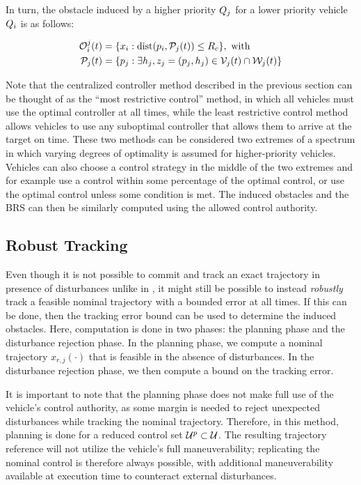 In turn, the obstacle induced by a higher priority $Q_{j}$ for a lower priority vehicle $Q_{i}$ is as follows:

\begin{equation}
\begin{aligned}
\mathcal{O}_i^j(t) &= \{x_i: \text{dist}(p_i, \mathcal{P}_j(t)) \le R_c \}, \text{ with} \\
\mathcal{P}_j(t) &= \{p_j: \exists h_j, z_j = (p_j, h_j) \in \mathcal{V}_j(t) \cap \mathcal{W}_j(t)\}
\end{aligned}
\end{equation}

Note that the centralized controller method described in the previous section can be thought of as the ``most restrictive control'' method, in which all vehicles must use the optimal controller at all times, while the least restrictive control method allows vehicles to use any suboptimal controller that allows them to arrive at the target on time. These two methods can be considered two extremes of a spectrum in which varying degrees of optimality is assumed for higher-priority vehicles. Vehicles can also choose a control strategy in the middle of the two extremes and for example use a control within some percentage of the optimal control, or use the optimal control unless some condition is met. The induced obstacles and the BRS can then be similarly computed using the allowed control authority.

\subsection{Robust Tracking} \label{sec:incomp_robust}
Even though it is not possible to commit and track an exact trajectory in presence of disturbances unlike in \cite{Chen15}, it might still be possible to instead \textit{robustly} track a feasible nominal trajectory with a bounded error at all times. If this can be done, then the tracking error bound can be used to determine the induced obstacles. Here, computation is done in two phases: the planning phase and the disturbance rejection phase. In the planning phase, we compute a nominal trajectory $x_{r,j}(\cdot)$ that is feasible in the absence of disturbances. In the disturbance rejection phase, we then compute a bound on the tracking error.

It is important to note that the planning phase does not make full use of the vehicle's control authority, as some margin is needed to reject unexpected disturbances while tracking the nominal trajectory. Therefore, in this method, planning is done for a reduced control set $\mathcal{U}^p\subset\mathcal{U}$. The resulting trajectory reference will not utilize the vehicle's full maneuverability; replicating the nominal control is therefore always possible, with additional maneuverability available at execution time to counteract external disturbances.

